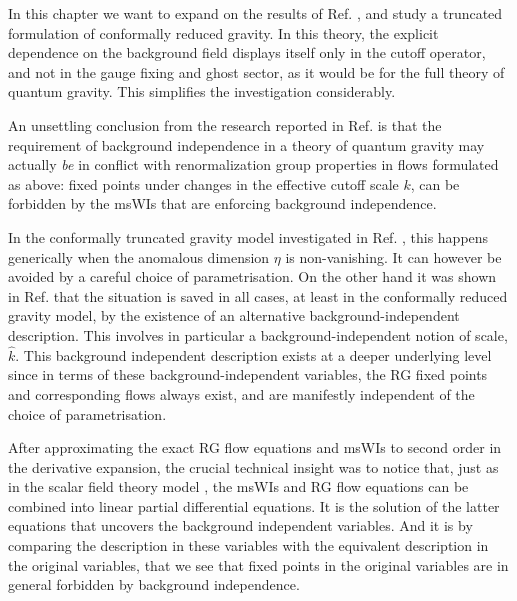 \documentclass[11pt]{book}
\numberwithin{equation}{chapter}
\begin{document}
In this chapter we want to expand on the results of Ref. \cite{Dietz:2015owa}, and study
a truncated formulation of conformally reduced gravity. In this theory, the explicit dependence
on the background field displays itself only in the cutoff operator, and not in the gauge
fixing and ghost sector, as it would be for the full theory of quantum gravity.
This simplifies the investigation considerably.

An unsettling conclusion from the research reported in Ref. \cite{Dietz:2015owa} is that the
requirement of background independence in a theory of quantum gravity may actually \textit{be}
in conflict with renormalization group properties in flows formulated as above:
fixed points under changes in the effective cutoff scale $k$, can be forbidden by the msWIs
that are enforcing background independence.%

In the conformally truncated gravity model investigated in Ref. \cite{Dietz:2015owa},
this happens generically when the anomalous dimension $\eta$ is non-vanishing.
It can however be avoided by a careful choice of parametrisation.
On the other hand it was shown in Ref. \cite{Dietz:2015owa} that the situation is saved in all cases,
at least in the conformally reduced gravity model,
by the existence of an alternative background-independent description.
This involves in particular a background-independent notion of scale, $\hat{k}$.
This background independent description exists at a deeper underlying level since in terms
of these background-independent variables, the RG fixed points and corresponding flows always exist,
and are manifestly independent of the choice of parametrisation.

After approximating the exact RG flow equations and msWIs to second order in the derivative expansion,
the crucial technical insight was to notice that, just as in the scalar field theory model
\cite{Bridle:2013sra}, the msWIs and RG flow equations can be combined into linear partial
differential equations.
It is the solution of the latter equations that uncovers the background independent variables.
And it is by comparing the description in these variables with the equivalent description
in the original variables, that we see that fixed points in the original variables are
in general forbidden by background independence.
\end{document}

